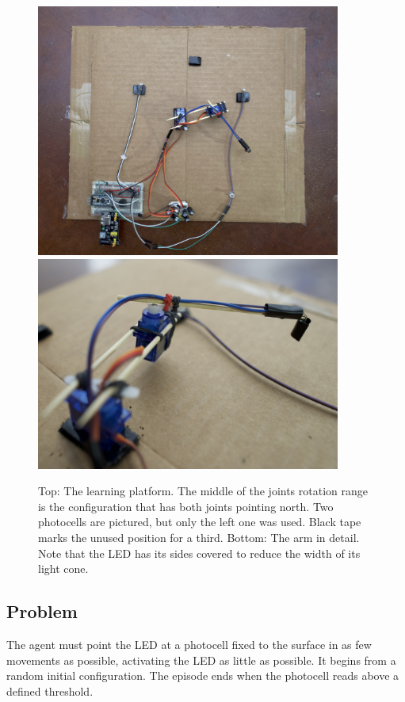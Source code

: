 \documentclass{article}
\begin{document}
\begin{figure}
	\centering
	\includegraphics[width=10cm]{../photos/eagle_small.jpg}
	\includegraphics[width=10cm]{../photos/arm_detail_small.jpg}
	\caption{Top: The learning platform. The middle of the joints rotation range is the configuration that has both joints pointing north. Two photocells are pictured, but only the left one was used. Black tape marks the unused position for a third. Bottom: The arm in detail. Note that the LED has its sides covered to reduce the width of its light cone. }
	\label{fig:platform}
\end{figure}


\subsection{Problem}

The agent must point the LED at a photocell fixed to the surface in as few movements as possible, activating the LED as little as possible. It begins from a random initial configuration. The episode ends when the photocell reads above a defined threshold. 
\end{document}

